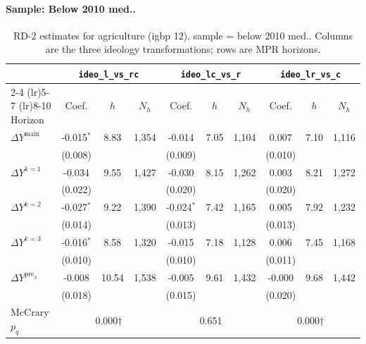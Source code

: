 \documentclass[11pt]{article}
\begin{document}
\paragraph{Sample: Below 2010 med..}
\begin{table}[H]
\centering
\scriptsize
\caption{RD-2 estimates for agriculture (igbp 12), sample = below 2010 med..
Columns are the three ideology transformations; rows are MPR horizons.}
\label{tab:rd2_agriculture_below}
\begin{tabular}{l ccc ccc ccc}
\toprule
 & \multicolumn{3}{c}{\texttt{ideo\_l\_vs\_rc}}
 & \multicolumn{3}{c}{\texttt{ideo\_lc\_vs\_r}}
 & \multicolumn{3}{c}{\texttt{ideo\_lr\_vs\_c}} \\
\cmidrule(lr){2-4} \cmidrule(lr){5-7} \cmidrule(lr){8-10}
Horizon & Coef. & $h$ & $N_h$ & Coef. & $h$ & $N_h$ & Coef. & $h$ & $N_h$ \\
\midrule
$\Delta Y^{\text{main}}$ & -0.015$^{*}$ & 8.83 & 1,354 & -0.014 & 7.05 & 1,104 & 0.007 & 7.10 & 1,116 \\
 & (0.008) &  &  & (0.009) &  &  & (0.010) &  &  \\
\addlinespace[1pt]
$\Delta Y^{k=1}$ & -0.034 & 9.55 & 1,427 & -0.030 & 8.15 & 1,262 & 0.003 & 8.21 & 1,272 \\
 & (0.022) &  &  & (0.020) &  &  & (0.020) &  &  \\
\addlinespace[1pt]
$\Delta Y^{k=2}$ & -0.027$^{*}$ & 9.22 & 1,390 & -0.024$^{*}$ & 7.42 & 1,165 & 0.005 & 7.92 & 1,232 \\
 & (0.014) &  &  & (0.013) &  &  & (0.013) &  &  \\
\addlinespace[1pt]
$\Delta Y^{k=3}$ & -0.016$^{*}$ & 8.58 & 1,320 & -0.015 & 7.18 & 1,128 & 0.006 & 7.45 & 1,168 \\
 & (0.010) &  &  & (0.010) &  &  & (0.011) &  &  \\
\addlinespace[1pt]
$\Delta Y^{\text{pre}_3}$ & -0.008 & 10.54 & 1,538 & -0.005 & 9.61 & 1,432 & -0.000 & 9.68 & 1,442 \\
 & (0.018) &  &  & (0.015) &  &  & (0.020) &  &  \\
\addlinespace[1pt]
\midrule
McCrary $p_q$ & \multicolumn{3}{c}{0.000$\dagger$} & \multicolumn{3}{c}{0.651} & \multicolumn{3}{c}{0.000$\dagger$} \\
\bottomrule
\end{tabular}
\end{table}
\end{document}
